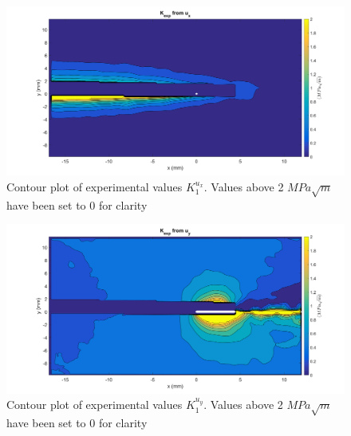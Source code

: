 \documentclass[12pt]{article}
\begin{document}
\begin{figure}[H]
	\centering
	\includegraphics[width=1\textwidth]{K_x.png}
	\caption{Contour plot of experimental values $K_1^{u_x}$.  Values above 2 $MPa\sqrt{m}$ have been set to 0 for clarity}
	\label{fig:kU}
\end{figure}

\begin{figure}[H]
	\centering
	\includegraphics[width=1\textwidth]{K_y.png}
	\caption{Contour plot of experimental values $K_1^{u_y}$. Values above 2 $MPa\sqrt{m}$ have been set to 0 for clarity}
	\label{fig:kV}
\end{figure}
\end{document}
